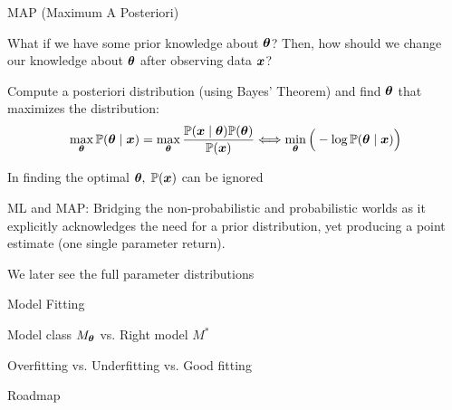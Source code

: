 \documentclass[handout,fleqn,aspectratio=169]{beamer}
\begin{document}
\begin{frame}{MAP (Maximum A Posteriori)}

\plitemsep 0.07in

\bci 

\item What if we have some prior knowledge about $\bm{\theta}$? Then, how should we change our knowledge about $\bm{\theta}$ after observing data $\bm{x}$?

\item Compute a posteriori distribution (using Bayes' Theorem) and find $\bm{\theta}$ that maximizes the distribution:
$$
\max_{\bm{\theta}} \mathbb{P}( \bm{\theta} \mid \bm{x} ) = \max_{\bm{\theta}} \frac{\mathbb{P}( \bm{x} \mid \bm{\theta} )\mathbb{P}( \bm{\theta} )}{\mathbb{P}( \bm{x} )} 
\Longleftrightarrow \min_{\bm{\theta}}\Big (  -\log \mathbb{P}( \bm{\theta} \mid \bm{x} ) \Big )
$$
\bci
\item In finding the optimal $\bm{\theta},$ $\mathbb{P}( \bm{x} )$ can be ignored
\eci
\item ML and MAP: Bridging the non-probabilistic and probabilistic worlds as it explicitly acknowledges the need for a prior distribution, yet producing a point estimate (one single parameter return). 

\item We later see the full parameter distributions
\eci
\end{frame}


\begin{frame}{Model Fitting}

\plitemsep 0.1in

\bci 

\item Model class $M_{\bm{\theta}}$ vs. Right model $M^*$

\item Overfitting vs. Underfitting vs. Good fitting
\eci
\end{frame}

\begin{frame}{Roadmap}

\plitemsep 0.1in

\bci 

\item {}
\item {} 
\item {}
\item {} 
\item {}

\eci
\end{frame}
\end{document}
